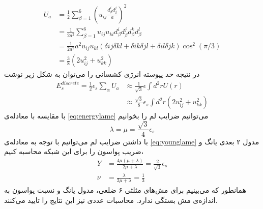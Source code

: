 \begin{equation}
\begin{aligned}
U_a&=\frac{1}{2}\sum_{\beta=1}^6(u_{ij}\frac{d_\beta^id_\beta^j}{a})^2\\
&=\frac{1}{2a^2}\sum_{\beta=1}^6u_{ij}u_{kl}d_\beta^id_\beta^jd_\beta^kd_\beta^l\\
&=\frac{1}{2a^2}a^2u_{ij}u_{kl}(\delta{ij}\delta{kl}+\delta{ik}\delta{jl}+\delta{il}\delta{jk})\cos^2(\pi/3)\\
&=\frac{3}{8}(2u_{ij}^2+u_{kk}^2)
\label{eq:gstrain1}
\end{aligned}
\end{equation}
در نتیجه‌ حد پیوسته انرژی کشسانی را می‌توان به شکل زیر نوشت
\begin{equation}
\begin{aligned}
E_s^{discrete}=\frac{1}{2}\epsilon_s\sum_\alpha U_a&\approx\frac{1}{\sqrt3}\epsilon\int d^2rU(r)\\
&\approx\frac{\sqrt3}{8}\epsilon_s\int d^2r(2u_{ij}^2+u_{kk}^2)
\end{aligned}
\end{equation}
با مقایسه با معادله‌ی 
\ref{eq:energylame}
می‌توانیم ضرایب لم را بخوانیم
\begin{equation}
\lambda=\mu=\frac{\sqrt3}{4}\epsilon_s
\end{equation}
با داشتن ضرایب لم می‌توانیم با توجه به معادله‌ی 
\ref{eq:younglame}
مدول ۲ بعدی یانگ و ضریب پواسون را برای این شبکه محاسبه کنیم،
\begin{equation}
\begin{aligned}
Y&=\frac{4\mu(\mu+\lambda)}{2\mu+\lambda}=\frac{2}{\sqrt3}\epsilon_s\\
\nu&=\frac{\lambda}{2\mu+\lambda}=\frac{1}{3}
\end{aligned}
\end{equation}
همانطور که می‌بینیم برای مش‌های مثلثی ۶ ضلعی، مدول یانگ و نسبت پواسون به اندازه‌ی مش بستگی ندارد. محاسبات عددی
\cite{springnetworkPRE2011}
نیز این نتایج را تایید می‌کنند.





















